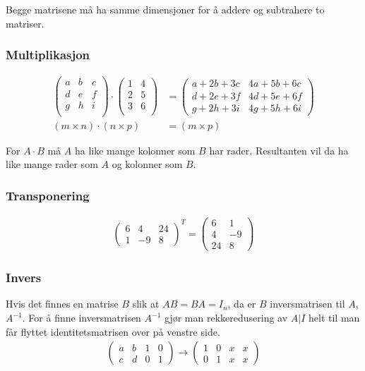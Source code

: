 \documentclass[12pt,norsk,a4paper]{article}
\begin{document}
Begge matrisene må ha samme dimensjoner for å addere og subtrahere to matriser.

\subsubsection*{Multiplikasjon}
\begin{align*}
\begin{pmatrix}
a	&	b	&	c	\\
d	&	e	&	f	\\
g	&	h	&	i	\\
\end{pmatrix}
\cdot
\begin{pmatrix}
1	&	4	\\
2	&	5	\\
3	&	6	\\
\end{pmatrix}
&=
\begin{pmatrix}
a + 2b + 3c	&	4a + 5b + 6c	\\
d + 2e + 3f	&	4d + 5e + 6f	\\
g + 2h + 3i	&	4g + 5h + 6i
\end{pmatrix}	\\
(m \times n) \cdot (n \times p) &= (m \times p)
\end{align*}

For $A \cdot B$ må $A$ ha like mange kolonner som $B$ har rader. Resultanten vil da ha like mange rader som $A$ og kolonner som $B$.

\subsubsection*{Transponering}
\begin{align*}
\begin{pmatrix}
6	&	4	&	24	\\
1	&	-9	&	8
\end{pmatrix}^{T}
=
\begin{pmatrix}
6	&	1	\\
4	&	-9	\\
24	&	8
\end{pmatrix}
\end{align*}

\newpage

\subsubsection{Invers}
Hvis det finnes en matrise $B$ slik at $AB = BA = I_{n}$, da er $B$ inversmatrisen til $A$, $A^{-1}$. For å finne inversmatrisen $A^{-1}$ gjør man rekkeredusering av $A|I$ helt til man får flyttet identitetsmatrisen over på venstre side.
\begin{align*}
\begin{pmatrix}
a	&	b	&	1	&	0	\\
c	&	d	&	0	&	1
\end{pmatrix}
\rightarrow
\begin{pmatrix}
1	&	0	&	x	&	x	\\
0	&	1	&	x	&	x
\end{pmatrix}
\end{align*}
\end{document}

